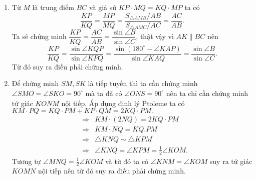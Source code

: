 \begin{ex}
{\begin{enumerate}
				\item Từ $M$ là trung điểm $BC$ và giả sử $KP\cdot MQ=KQ\cdot MP$ ta có $$ \dfrac{KP}{KQ}=\dfrac{MP}{MQ}=\dfrac{S_{\triangle AMB}/AB}{S_{\triangle AMC}/AC}=\dfrac{AC}{AB}.$$
				Ta sẽ chứng minh $\dfrac{KP}{KQ}=\dfrac{AC}{AB}=\dfrac{\sin\angle B}{\sin\angle C}$, thật vậy vì $AK\parallel BC$ nên
				\begin{equation*}
				\dfrac{KP}{KQ}=\dfrac{\sin\angle KQP}{\sin\angle KPQ}=\dfrac{\sin (180^{\circ}-\angle KAP)}{\sin\angle KAQ}=\dfrac{\sin\angle B}{\sin\angle C} .
				\end{equation*}
				Từ đó suy ra điều phải chứng minh.
				\item  Để chứng minh $SM, SK$ là tiếp tuyến thì ta cần chứng minh  $\angle SMO = \angle SKO = 90^{\circ}$ mà ta đã có $\angle ONS = 90^{\circ}$ nên ta chỉ cần chứng minh tứ giác $KONM$ nội tiếp. Áp dụng định lý Ptoleme ta có $KM\cdot PQ=KQ\cdot PM+KP\cdot QM=2KQ\cdot PM.$
				\begin{eqnarray*}
					& \Rightarrow & KM\cdot (2NQ)=2KQ\cdot PM\\
					& \Rightarrow & KM\cdot NQ=KQ.PM \\
					& \Rightarrow & \triangle KNQ\sim \triangle KPM\\
					& \Rightarrow & \angle KNQ=\angle KPM=\frac{1}{2}\angle KOM.
				\end{eqnarray*}
				Tương tự  $\angle MNQ=\frac{1}{2}\angle KOM$ và từ đó ta có $\angle KNM=\angle KOM$ suy ra tứ giác $KOMN$ nội tiếp nên từ đó suy ra điều phải chứng minh.		
			\end{enumerate}
		}
	\end{ex}	
